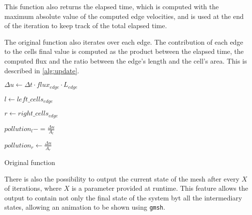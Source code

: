 This function also returns the elapsed time, which is computed with the maximum absolute value of the computed edge velocities, and is used at the end of the iteration to keep track of the total elapsed time.

The original \update function also iterates over each edge. The contribution of each edge to the cells final value is computed as the product between the elapsed time, the computed flux and the ratio between the edge's length and the cell's area. This is described in \cref{alg:update}.

\begin{algorithm}[!htp]
	\begin{algorithmic}

			$\Delta{u} \gets \Delta{t} \cdot flux_{edge} \cdot L_{edge}$

			$l \gets left\_cells_{edge}$

			$r \gets right\_cells_{edge}$

			$pollution_{l} -= \frac{\Delta{u}}{A_{l}}$


				$pollution_{r} \gets \frac{\Delta{u}}{A_{r}}$
			\EndIf
		\EndFor
	\end{algorithmic}

	\caption{Original \update function}
	\label{alg:update}
\end{algorithm}



There is also the possibility to output the current state of the mesh after every $X$ of iterations, where $X$ is a parameter provided at runtime. This feature allows the output to contain not only the final state of the system byt all the intermediary states, allowing  an animation to be shown using \texttt{gmsh}.


